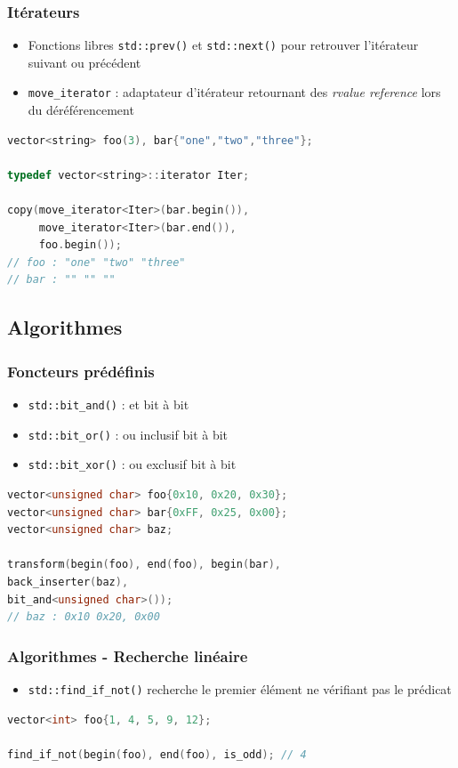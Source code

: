 \documentclass[C++.tex]{subfiles}
\begin{document}
\begin{frame}[fragile]
	\frametitle{Itérateurs}
	\begin{itemize}
		\item Fonctions libres \lstinline|std::prev()| et \lstinline|std::next()| pour retrouver l'itérateur suivant ou précédent
		\item \lstinline|move_iterator| : adaptateur d'itérateur retournant des \textit{rvalue reference} lors du déréférencement
	\end{itemize}

	\begin{lstlisting}[language=C++]
vector<string> foo(3), bar{"one","two","three"};

typedef vector<string>::iterator Iter;

copy(move_iterator<Iter>(bar.begin()),
     move_iterator<Iter>(bar.end()),
     foo.begin());
// foo : "one" "two" "three"
// bar : "" "" ""\end{lstlisting}

\end{frame}

\subsection*{Algorithmes}
\begin{frame}[fragile]
	\frametitle{Foncteurs prédéfinis}
	\begin{itemize}
		\item \lstinline|std::bit_and()| : et bit à bit
		\item \lstinline|std::bit_or()| : ou inclusif bit à bit
		\item \lstinline|std::bit_xor()| : ou exclusif bit à bit
	\end{itemize}

	\begin{lstlisting}[language=C++]
vector<unsigned char> foo{0x10, 0x20, 0x30};
vector<unsigned char> bar{0xFF, 0x25, 0x00};
vector<unsigned char> baz;

transform(begin(foo), end(foo), begin(bar), 
back_inserter(baz), 
bit_and<unsigned char>());
// baz : 0x10 0x20, 0x00\end{lstlisting}
\end{frame}

\begin{frame}[fragile]
	\frametitle{Algorithmes - Recherche linéaire}
	\begin{itemize}
		\item \lstinline|std::find_if_not()| recherche le premier élément ne vérifiant pas le prédicat
	\end{itemize}

	\begin{lstlisting}[language=C++]
vector<int> foo{1, 4, 5, 9, 12};

find_if_not(begin(foo), end(foo), is_odd); // 4\end{lstlisting}
\end{frame}
\end{document}
